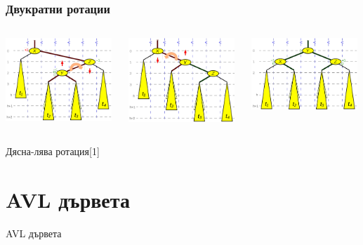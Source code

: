 \documentclass{beamer}
\begin{document}
\begin{frame}[fragile]
  \frametitle{Двукратни ротации}
    
  \begin{columns}[t]
    \begin{column}{0.33\textwidth}
        \includegraphics[width=4cm]{images/bal_tree_right_left_rotation_1}
    \end{column}
    \begin{column}{0.33\textwidth}
         \includegraphics[width=4cm]{images/bal_tree_right_left_rotation_2}
    \end{column}
    \begin{column}{0.33\textwidth}
      \includegraphics[width=4cm]{images/bal_tree_right_left_rotation_3}
 \end{column}
\end{columns}
  \centerline{Дясна-лява ротация[1]}  
\end{frame}
  

  \section{AVL дървета}

  \begin{frame}
    \centerline{AVL дървета}
  \end{frame}
    
\end{document}
